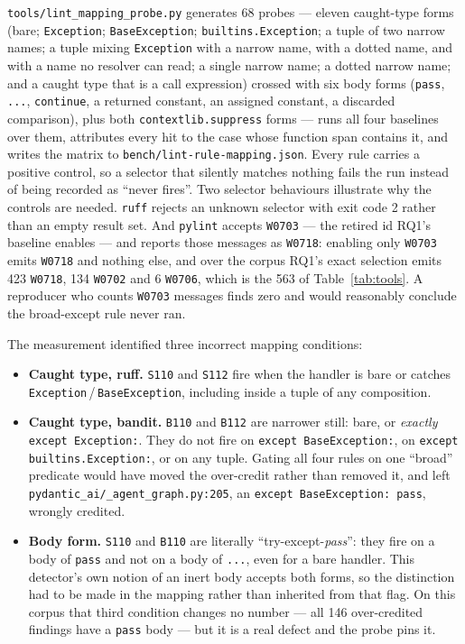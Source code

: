 \documentclass[10pt,a4paper]{article}
\begin{document}
\texttt{tools/lint\_mapping\_probe.py} generates 68 probes --- eleven caught-type forms
(bare; \texttt{Exception}; \texttt{BaseException}; \texttt{builtins.Exception}; a tuple
of two narrow names; a tuple mixing \texttt{Exception} with a narrow name, with a dotted
name, and with a name no resolver can read; a single narrow name; a dotted narrow name;
and a caught type that is a call expression) crossed with six body forms
(\texttt{pass}, \texttt{...}, \texttt{continue}, a returned constant, an assigned
constant, a discarded comparison), plus both \texttt{contextlib.suppress} forms ---
runs all four baselines over them, attributes every hit to the case whose function span
contains it, and writes the matrix to \texttt{bench/lint-rule-mapping.json}. Every rule
carries a positive control, so a selector that silently matches nothing fails the run
instead of being recorded as ``never fires''. Two selector behaviours illustrate
why the controls are needed.
\texttt{ruff} rejects an unknown selector with exit code 2 rather than an empty result
set. And \texttt{pylint} accepts \texttt{W0703} --- the retired id RQ1's baseline
enables --- and reports those messages as \texttt{W0718}: enabling only \texttt{W0703}
emits \texttt{W0718} and nothing else, and over the corpus RQ1's exact selection emits
423 \texttt{W0718}, 134 \texttt{W0702} and 6 \texttt{W0706}, which is the 563 of
Table~\ref{tab:tools}. A reproducer who counts \texttt{W0703} messages finds zero and
would reasonably conclude the broad-except rule never ran.

The measurement identified three incorrect mapping conditions:
\begin{itemize}[nosep,leftmargin=*]
\item \textbf{Caught type, ruff.} \texttt{S110} and \texttt{S112} fire when the handler
  is bare or catches \texttt{Exception}\,/\allowbreak\,\texttt{BaseException}, including
  inside a tuple of any composition.
\item \textbf{Caught type, bandit.} \texttt{B110} and \texttt{B112} are narrower still:
  bare, or \emph{exactly} \texttt{except Exception:}. They do not fire on
  \texttt{except BaseException:}, on \texttt{except builtins.Exception:}, or on any
  tuple. Gating all four rules on one ``broad'' predicate would
  have moved the over-credit rather than removed it, and left
  \texttt{pydantic\_ai/\_agent\_graph.py:205}, an
  \texttt{except BaseException: pass}, wrongly credited.
\item \textbf{Body form.} \texttt{S110} and \texttt{B110} are literally
  ``try-except-\emph{pass}'': they fire on a body of \texttt{pass} and not on a body of
  \texttt{...}, even for a bare handler. This detector's own notion of an inert body
  accepts both forms, so the distinction had to be made in the mapping rather than
  inherited from that flag. On this corpus that third condition changes no number ---
  all 146 over-credited findings have a \texttt{pass} body --- but it is a real defect
  and the probe pins it.
\end{itemize}
\end{document}
